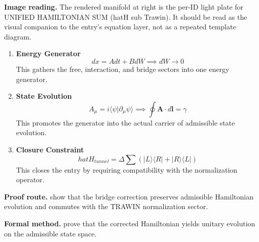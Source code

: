 \begin{samepage}
\noindent\begin{minipage}[t]{0.45\linewidth}
\vspace{0pt}
\raggedright
\scriptsize\textbf{Image reading.} The rendered manifold at right is the per-ID light plate for UNIFIED HAMILTONIAN SUM (hatH sub Trawin). It should be read as the visual companion to the entry's equation layer, not as a repeated template diagram.\par
\end{minipage}\hfill
\begin{minipage}[t]{0.53\linewidth}
\vspace*{-0.10in}
\raggedright
{}
\end{minipage}
\end{samepage}

\clearpage


\begin{enumerate}[leftmargin=1.6em,itemsep=9pt,topsep=6pt]
\item \textbf{Energy Generator}
\[
dx = A dt + B dW \implies dW \to 0
\]
This gathers the free, interaction, and bridge sectors into one energy generator.

\item \textbf{State Evolution}
\[
A_\mu = i\langle \psi | \partial_\mu \psi \rangle \implies \oint \mathbf{A} \cdot d\mathbf{l} = \gamma
\]
This promotes the generator into the actual carrier of admissible state evolution.

\item \textbf{Closure Constraint}
\[
hat{H}_{tunnel} = \Delta \sum (|L\rangle \langle R| + |R\rangle \langle L|)
\]
This closes the entry by requiring compatibility with the normalization operator.
\end{enumerate}

\textbf{Proof route.} show that the bridge correction preserves admissible Hamiltonian evolution and commutes with the TRAWIN normalization sector.

\textbf{Formal method.} prove that the corrected Hamiltonian yields unitary evolution on the admissible state space.

\medskip
{}

